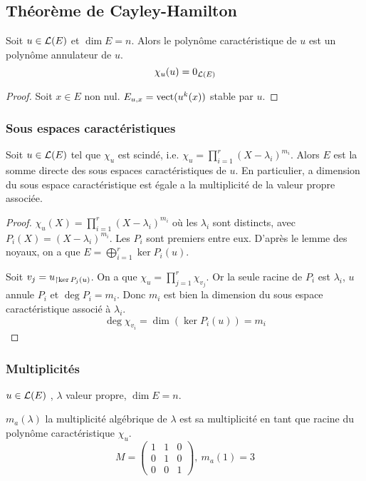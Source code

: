 \subsection{Théorème de Cayley-Hamilton}


\begin{theorem}
	Soit $u \in \mathcal{L}(E)$ et $\dim E = n$. Alors le polynôme caractéristique de $u$ est un polynôme annulateur de $u$.
	$$ \chi_u(u) = 0_{\mathcal{L}(E)}$$
\end{theorem}


\begin{proof}
	Soit $x \in E$ non nul. $E_{u,x} = \text{vect}(u^k(x))$ stable par $u$.

\end{proof}


\subsubsection{Sous espaces caractéristiques}

\begin{coro}
	Soit $u \in \mathcal{L}(E)$ tel que $\chi_u$ est scindé, i.e. $\chi_u = \prod_{i=1}^r (X - \lambda_i)^{m_i}$.
	Alors $E$ est la somme directe des sous espaces caractéristiques de $u$. En particulier, a dimension du
	sous espace caractéristique est égale a la multiplicité de la valeur propre associée.
\end{coro}

\begin{proof}
	$\chi_u(X) = \prod_{i=1}^r (X - \lambda_i)^{m_i}$ où les $\lambda_i$ sont distincts, avec $P_i(X) = (X - \lambda_i)^{m_i}$.
	Les $P_i$ sont premiers entre eux. D'après le lemme des noyaux, on a que $E = \bigoplus_{i=1}^r \ker P_i(u)$.

	Soit $v_j = u_{\restriction \ker P_j(u)}$. On a que $\chi_u = \prod_{j=1}^r \chi_{v_j}$. Or la seule racine de $P_i$ est $\lambda_i$,
	$u$ annule $P_i$ et $\deg P_i = m_i$. Donc $m_i$ est bien la dimension du sous espace caractéristique associé à $\lambda_i$.
	$$ \deg \chi_{v_i} = \dim (\ker P_i(u)) = m_i$$
\end{proof}

\subsubsection{Multiplicités}

$u \in \mathcal{L}(E)$ , $\lambda$ valeur propre, $\dim E = n$.

$m_a(\lambda)$ la multiplicité algébrique de $\lambda$ est sa multiplicité en tant que racine du polynôme caractéristique $\chi_u$.
$$ M = \begin{pmatrix}
		1 & 1 & 0 \\ 0 & 1 & 0 \\ 0 & 0 & 1
	\end{pmatrix},  \ m_a(1) = 3$$

